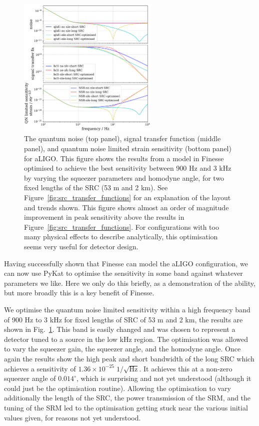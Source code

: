 \documentclass[aps,pra,superscriptaddress,reprint,nofootinbib]{revtex4-1}
\begin{document}
\begin{figure}[ht]
	\begin{center}
	\includegraphics[width=0.6\textwidth]{figures/aLIGO_optimum_sensitivity_comparison.pdf}
	\end{center}
	\caption{The quantum noise (top panel), signal transfer function (middle panel), and quantum noise limited strain sensitivity (bottom panel) for aLIGO. This figure shows the results from a model in Finesse optimised to achieve the best sensitivity between 900 Hz and 3 kHz by varying the squeezer parameters and homodyne angle, for two fixed lengths of the SRC (53 m and 2 km).
	See Figure~\ref{fig:src_transfer_functions} for an explanation of the layout and trends shown. This figure shows almost an order of magnitude improvement in peak sensitivity above the results in Figure~\ref{fig:src_transfer_functions}. For configurations with too many physical effects to describe analytically, this optimisation seems very useful for detector design.}
	\label{fig:aLIGO_optimum_sensitivity_comparison}
\end{figure}

Having successfully shown that Finesse can model the aLIGO configuration, we can now use PyKat to optimise the sensitivity in some band against whatever parameters we like. Here we only do this briefly, as a demonstration of the ability, but more broadly this is a key benefit of Finesse.


We optimise the quantum noise limited sensitivity within a high frequency band of 900 Hz to 3 kHz for fixed lengths of SRC of 53 m and 2 km, the results are shown in Fig.~\ref{fig:aLIGO_optimum_sensitivity_comparison}. This band is easily changed and was chosen to represent a detector tuned to a source in the low kHz region. The optimisation was allowed to vary the squeezer gain, the squeezer angle, and the homodyne angle. Once again the results show the high peak and short bandwidth of the long SRC which achieves a sensitivity of $1.36 \times 10^{-25}\; 1/\sqrt{\mathrm{Hz}}$. It achieves this at a non-zero squeezer angle of $0.014^\circ$, which is surprising and not yet understood (although it could just be the optimisation routine). Allowing the optimisation to vary additionally the length of the SRC, the power transmission of the SRM, and the tuning of the SRM led to the optimisation getting stuck near the various initial values given, for reasons not yet understood.
\end{document}
